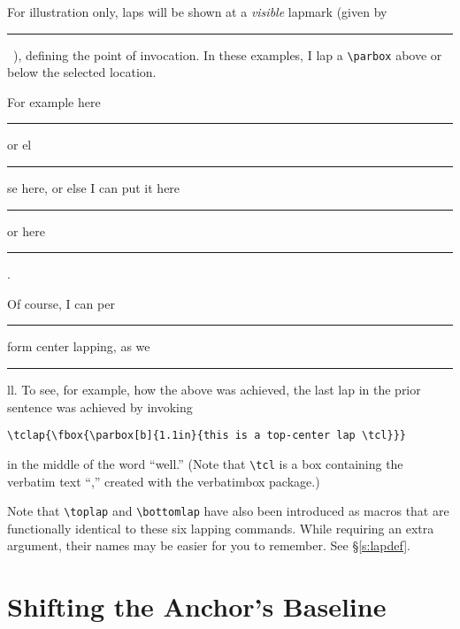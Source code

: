 \documentclass{article}
\let\vb\verb
\def\lapmark{\rule[-.3\baselineskip]{.1ex}{\baselineskip}}
\begin{document}
For illustration only, laps will be shown at a \textit{visible} lapmark
(given by \lapmark~), defining the point of invocation.  In these
examples, I lap a \vb|\parbox| above or below the selected location.

\begin{myverbbox}{\bll}\bllap\end{myverbbox}
\begin{myverbbox}{\brl}\brlap\end{myverbbox}
\begin{myverbbox}{\tll}\tllap\end{myverbbox}
\begin{myverbbox}{\trl}\trlap\end{myverbbox}
\begin{myverbbox}{\bcl}\bclap\end{myverbbox}
\begin{myverbbox}{\tcl}\tclap\end{myverbbox}
For example here\lapmark%
or el\lapmark%
%
se here, or else I can put it here\lapmark%
or here\lapmark%
%
.\

Of course, I can per\lapmark
{}%
form center lapping, as we\lapmark%
%
ll.
To see, for example, how the above was achieved, the last lap in the
prior sentence was achieved by invoking

\vb|\tclap{\fbox{\parbox[b]{1.1in}{this is a top-center lap \tcl}}}|

in the middle of the word ``well.''  (Note that \vb|\tcl| is a box
containing the verbatim text ``\tcl,'' created with the
\textsf{verbatimbox} package.)

Note that \vb|\toplap| and \vb|\bottomlap| have also been introduced
as macros that are functionally identical to these six lapping commands.
While requiring an extra argument, their names may be easier for you to
remember.  See \S\ref{s:lapdef}.\vspace{-1ex}

\section{Shifting the Anchor's Baseline} 
\end{document}
